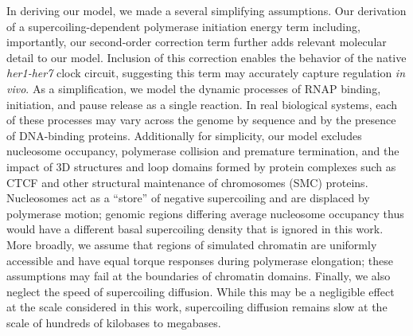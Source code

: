 \documentclass[11pt]{article}
\begin{document}
In deriving our model, we made a several simplifying assumptions. Our derivation of a supercoiling-dependent polymerase initiation energy term including, importantly, our second-order correction term further adds relevant molecular detail to our model. Inclusion of this correction enables the behavior of the native \emph{her1-her7} clock circuit, suggesting this term may accurately capture regulation \textit{in vivo}. As a simplification,  we model the dynamic processes of RNAP binding, initiation, and pause release as a single reaction. In real biological systems, each of these processes may vary across the genome by sequence and by the presence of DNA-binding proteins. Additionally for simplicity, our model excludes  nucleosome occupancy, polymerase collision and premature termination, and the impact of 3D structures and loop domains formed by protein complexes such as CTCF and other structural maintenance of chromosomes (SMC) proteins. Nucleosomes act as a ``store'' of negative supercoiling and are displaced by polymerase motion; genomic regions differing average nucleosome occupancy thus would have a different basal supercoiling density that is ignored in this work. More broadly, we assume that regions of simulated chromatin are uniformly accessible and have equal torque responses during polymerase elongation; these assumptions may fail at the boundaries of chromatin domains. Finally, we also neglect the speed of supercoiling diffusion. While this may be a negligible effect at the scale considered in this work, supercoiling diffusion remains slow at the scale of hundreds of kilobases to megabases.



\end{document}
